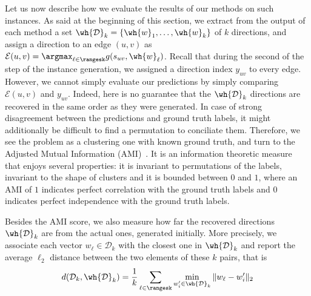 Let us now describe how we evaluate the results of our methods on such instances. As said at the
beginning of this section, we extract from the output of each method a set $\mathcal{\wh{D}}_k =
\{\wh{w}_1, \ldots, \wh{w}_k\}$ of $k$ directions, and assign a 
direction to an edge $(u,v)$ as $\mathcal{E}(u,v) = \argmax_{\ell \in \rangesk} g(s_{uv}, \wh{w}_\ell)$.
Recall that during the second of the step of the instance generation, we assigned a direction index
$y_{uv}$ to every edge.
However, we cannot simply evaluate our predictions by simply comparing $\mathcal{E}(u,v)$ and
$y_{uv}$. Indeed, here is no guarantee that the $\mathcal{\wh{D}}_k$
directions are recovered in the same order as they were generated. In case of strong disagreement
between the predictions and ground truth labels, it might additionally be difficult to find a
permutation to conciliate them.  Therefore, we see the problem as a clustering one with known ground
truth, and turn to the Adjusted Mutual Information (AMI)~\autocite{AMI09}. It is an information
theoretic measure that enjoys several properties: it is invariant to permutations of the labels,
invariant to the shape of clusters and it is bounded between $0$ and $1$, where an AMI of $1$
indicates perfect correlation with the ground truth labels and $0$ indicates perfect independence
with the ground truth labels.

Besides the AMI score, we also measure how far the recovered directions $\mathcal{\wh{D}}_k$
are from the actual ones, generated initially. More precisely, we associate each vector $w_\ell \in
\mathcal{D}_k$ with the closest one in $\mathcal{\wh{D}}_k$ and report the average $\ell_2$ distance
between the two elements of these $k$ pairs, that is
\begin{equation*}
  d(\mathcal{D}_k, \mathcal{\wh{D}}_k) =
  \frac{1}{k} \sum_{\ell \in \rangesk} \min_{w'_i \in \mathcal{\wh{D}}_k} \| w_\ell - w'_i \|_2
\end{equation*}

\medskip


